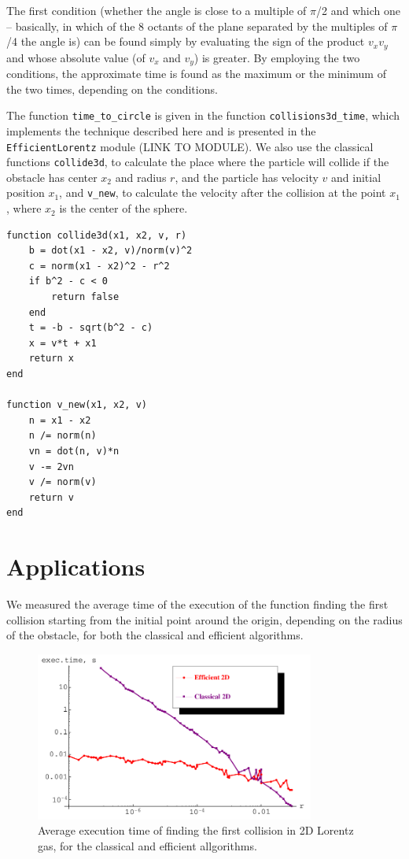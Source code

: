\documentclass[prl,amsmath,amssymb, twocolumn, showpacs]{revtex4-1}
\begin{document}
The first condition (whether the angle is close to a multiple of $\pi$/2 and which one – basically, in which of the 8 octants of the plane separated by the multiples of $\pi$/4 the angle is) can be found simply by evaluating the sign of the product $v_x v_y$ and whose absolute value (of $v_x$ and $v_y$) is greater. By employing the two conditions, the approximate time is found as the maximum or the minimum of the two times, depending on the conditions.

The function \texttt{time\_to\_circle} is given in the function \texttt{collisions3d\_time}, which implements the technique described here and is presented in the \texttt{EfficientLorentz} module (LINK TO MODULE). We also use the classical functions \texttt{collide3d}, to calculate the place where the particle will collide if the obstacle has center $x_2$ and radius $r$, and the particle has velocity $v$ and initial position $x_1$, and \texttt{v\_new}, to calculate the velocity after the collision at the point $x_1$, where $x_2$ is the center of the sphere.

\begin{verbatim}
function collide3d(x1, x2, v, r) 
    b = dot(x1 - x2, v)/norm(v)^2 
    c = norm(x1 - x2)^2 - r^2 
    if b^2 - c < 0
        return false 
    end 
    t = -b - sqrt(b^2 - c) 
    x = v*t + x1 
    return x 
end 

function v_new(x1, x2, v) 
    n = x1 - x2 
    n /= norm(n) 
    vn = dot(n, v)*n 
    v -= 2vn 
    v /= norm(v) 
    return v 
end
\end{verbatim}

\section{Applications}

We measured the average time of the execution of the function finding the first collision starting from the initial point around the origin, depending on the radius of the obstacle, for both the classical and efficient algorithms.

\begin{figure}
\centering
\includegraphics [width=260pt]{fig05.png}
\caption{Average execution time of finding the first collision in 2D Lorentz gas, for the classical and efficient allgorithms.}
\label{fig:fig05}
\end{figure}
\end{document}
